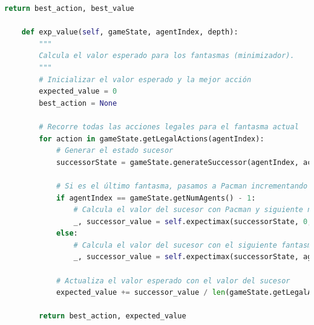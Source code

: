 \documentclass{report}
\begin{document}
\begin{lstlisting}[language=Python, caption=Implementación inicial del agente Expectimax]
        return best_action, best_value
    
    def exp_value(self, gameState, agentIndex, depth):
        """
        Calcula el valor esperado para los fantasmas (minimizador).
        """
        # Inicializar el valor esperado y la mejor acción
        expected_value = 0
        best_action = None

        # Recorre todas las acciones legales para el fantasma actual
        for action in gameState.getLegalActions(agentIndex):
            # Generar el estado sucesor
            successorState = gameState.generateSuccessor(agentIndex, action)
            
            # Si es el último fantasma, pasamos a Pacman incrementando la profundidad
            if agentIndex == gameState.getNumAgents() - 1:
                # Calcula el valor del sucesor con Pacman y siguiente nivel de profundidad
                _, successor_value = self.expectimax(successorState, 0, depth + 1)
            else:
                # Calcula el valor del sucesor con el siguiente fantasma
                _, successor_value = self.expectimax(successorState, agentIndex + 1, depth)
            
            # Actualiza el valor esperado con el valor del sucesor
            expected_value += successor_value / len(gameState.getLegalActions(agentIndex))

        return best_action, expected_value
          \end{lstlisting}
\end{document}
